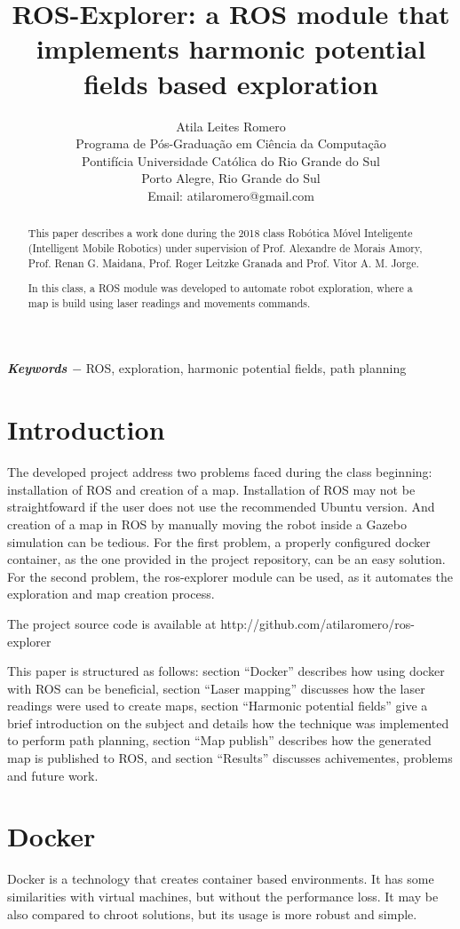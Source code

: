 \documentclass[a4paper,twocolumn]{article}
\title{ROS-Explorer: a ROS module that implements harmonic potential fields based exploration}
\author{
    Atila Leites Romero \\
    Programa de Pós-Graduação em Ciência da Computação \\
    Pontifícia Universidade Católica do Rio Grande do Sul \\
    Porto Alegre, Rio Grande do Sul \\
    Email: atilaromero@gmail.com
    }
\begin{document}
\date{}
\maketitle

\begin{abstract}
    This paper describes a work done during the 2018 class Robótica Móvel Inteligente (Intelligent Mobile Robotics) under supervision of Prof. Alexandre de Morais Amory, Prof. Renan G. Maidana, Prof. Roger Leitzke Granada and Prof. Vitor A. M. Jorge.
    
    In this class, a ROS module was developed to automate robot exploration, where a map is build using laser readings and movements commands.
\end{abstract}
{
    \par	
    \textbf{\textit{Keywords $-$}} 
    ROS, exploration, harmonic potential fields, path planning
}

\section{Introduction}
    The developed project address two problems faced during the class beginning: installation of ROS\cite{ROS} and creation of a map. Installation of ROS may not be straightfoward if the user does not use the recommended Ubuntu version. And creation of a map in ROS by manually moving the robot inside a Gazebo\cite{gazebo} simulation can be tedious. For the first problem, a properly configured docker container, as the one provided in the project repository, can be an easy solution. For the second problem, the ros-explorer module can be used, as it automates the exploration and map creation process.

    The project source code is available at http://github.com/atilaromero/ros-explorer

    This paper is structured as follows: section ``Docker'' describes how using docker with ROS can be beneficial, section ``Laser mapping'' discusses how the laser readings were used to create maps, section ``Harmonic potential fields'' give a brief introduction on the subject and details how the technique was implemented to perform path planning, section ``Map publish'' describes how the generated map is published to ROS, and section ``Results'' discusses achivementes, problems and future work.

\section{Docker}
    Docker\cite{docker} is a technology that creates container based environments. It has some similarities with virtual machines, but without the performance loss. It may be also compared to chroot solutions, but its usage is more robust and simple.
\end{document}
